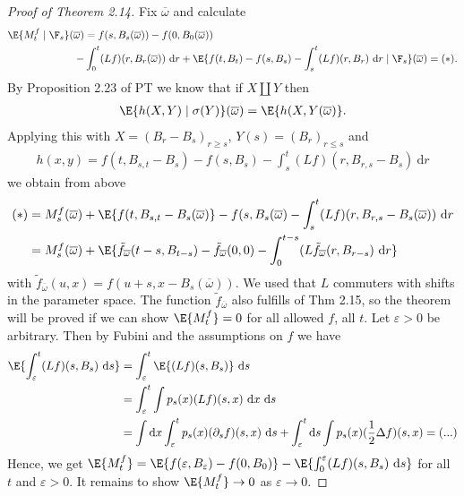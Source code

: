 \begin{proof}[Proof of Theorem 2.14]
Fix $\overline{\omega}$ and calculate
\begin{align*}
\E{M_t^f\mid \F_s}(\overline{\omega})&=f(s,B_s(\overline{\omega}))-f(0,B_0(\overline{\omega}))\\
-&\int_0^t (Lf)(r,B_r(\overline{\omega}))~\mathrm{d}r +\E{f(t,B_t)-f(s,B_s)-\int_s^t (Lf)(r,B_r)~\mathrm{d}r\mid \F_s}(\overline{\omega})=(\ast).
\end{align*}
By Proposition 2.23 of PT we know that if $X \amalg Y$ then
\begin{align*}
\E{h(X,Y)\mid \sigma(Y)}(\overline{\omega})=\E{h(X,Y(\overline{\omega})}.
\end{align*}
Applying this with $X=(B_r-B_s)_{r\geq s}$, $Y(s)=(B_r)_{r \leq s}$
and
\begin{align*}
h(x,y)=f(t,B_{s,t}-B_s)-f(s,B_s)-\int_s^t (Lf)(r,B_{r,s}-B_s)~\mathrm{d}r
\end{align*}
we obtain from above
\begin{align*}
(\ast)&=M_s^f(\overline{\omega})+\E{f(t,B_{s,t}-B_s(\overline{\omega})}-f(s,B_s(\overline{\omega})-\int_s^t (Lf)(r,B_{r,s}-B_s(\overline{\omega}))~\mathrm{d}r\\
&=M_s^f(\overline{\omega})+\E{\tilde{f}_{\overline{\omega}}(t-s,B_{t-s})-\tilde{f}_{\overline{\omega}}(0,0)-\int_0^{t-s} (L\tilde{f}_{\overline{\omega}}(r,B_{r-s})~\mathrm{d}r}
\end{align*}
with $\tilde{f}_{\overline{\omega}}(u,x)=f(u+s,x-B_s(\overline{\omega}))$.
We used that $L$ commuters with shifts in the parameter space.
The function $\tilde{f}_{\overline{\omega}}$ also fulfills of Thm 2.15, so the theorem will be proved if we can show $\E{M_t^f}=0$ for all allowed $f$, all $t$.
Let $\varepsilon>0$ be arbitrary. Then by Fubini and the assumptions on $f$ we have
\begin{align*}
\E{\int_\varepsilon^t(Lf)(s,B_s)~\mathrm{d}s}&=\int_\varepsilon^t \E{(Lf)(s,B_s)}~\mathrm{d}s\\
&=\int_\varepsilon^t \int p_s(x) (Lf)(s,x)~\mathrm{d}x~\mathrm{d}s\\
&=\int \mathrm{d}x \int_\varepsilon^t p_s(x)(\partial_s f)(s,x)~\mathrm{d}s+\int_\varepsilon^t \mathrm{d}s \int p_s(x)(\frac{1}{2}\Delta f)(s,x)= (...)
\end{align*}
Hence, we get $\E{M_t^f}=\E{f(\varepsilon,B_\varepsilon)-f(0,B_0)}-\E{\int_0^\varepsilon (Lf)(s,B_s)~\mathrm{d}s}$ for all $t$ and $\varepsilon>0$.
It remains to show $\E{M_t^f}\to 0$ as $\varepsilon \to 0$.

\end{proof}
